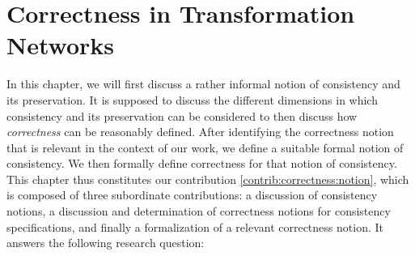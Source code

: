 \chapter{Correctness in Transformation Networks
}
\label{chap:correctness}




In this chapter, we will first discuss a rather informal notion of consistency and its preservation. It is supposed to discuss the different dimensions in which consistency and its preservation can be considered to then discuss how \emph{correctness} can be reasonably defined.
After identifying the correctness notion that is relevant in the context of our work, we define a suitable formal notion of consistency.
We then formally define correctness for that notion of consistency.
This chapter thus constitutes our contribution \autoref{contrib:correctness:notion}, which is composed of three subordinate contributions: a discussion of consistency notions, a discussion and determination of correctness notions for consistency specifications, and finally a formalization of a relevant correctness notion.
It answers the following research question:








